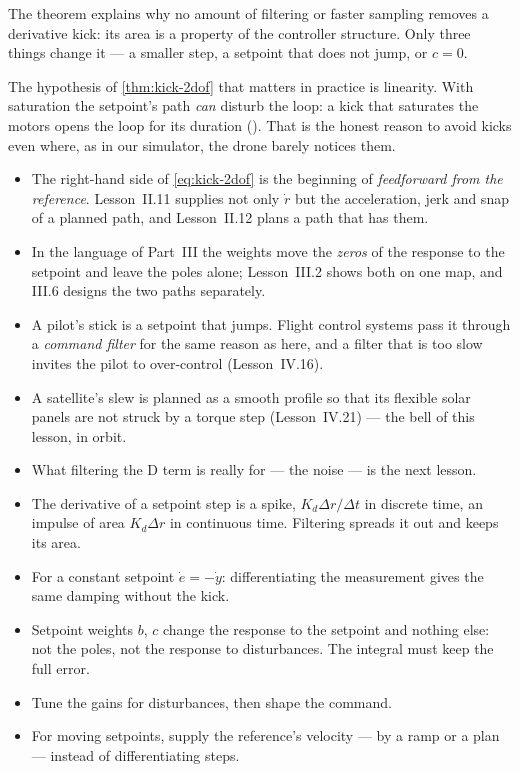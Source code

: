 The theorem explains why no amount of filtering or faster sampling removes a derivative kick: its area is a property of the controller structure. Only three things change it — a smaller step, a setpoint that does not jump, or $c = 0$.

The hypothesis of \cref{thm:kick-2dof} that matters in practice is linearity. With saturation the setpoint's path \emph{can} disturb the loop: a kick that saturates the motors opens the loop for its duration (). That is the honest reason to avoid kicks even where, as in our simulator, the drone barely notices them.

\begin{lookahead}
\begin{itemize}[leftmargin=1.2em]
  \item The right-hand side of \cref{eq:kick-2dof} is the beginning of \emph{feedforward from the reference}. Lesson~II.11 supplies not only $\dot r$ but the acceleration, jerk and snap of a planned path, and Lesson~II.12 plans a path that has them.
  \item In the language of Part~III the weights move the \emph{zeros} of the response to the setpoint and leave the poles alone; Lesson~III.2 shows both on one map, and III.6 designs the two paths separately.
  \item A pilot's stick is a setpoint that jumps. Flight control systems pass it through a \emph{command filter} for the same reason as here, and a filter that is too slow invites the pilot to over-control (Lesson~IV.16).
  \item A satellite's slew is planned as a smooth profile so that its flexible solar panels are not struck by a torque step (Lesson~IV.21) — the bell of this lesson, in orbit.
  \item What filtering the D term is really for — the noise — is the next lesson.
\end{itemize}
\end{lookahead}

\begin{remember}
\begin{itemize}
  \item The derivative of a setpoint step is a spike, $K_d\Delta r/\Delta t$ in discrete time, an impulse of area $K_d\Delta r$ in continuous time. Filtering spreads it out and keeps its area.
  \item For a constant setpoint $\dot e = -\dot y$: differentiating the measurement gives the same damping without the kick.
  \item Setpoint weights $b$, $c$ change the response to the setpoint and nothing else: not the poles, not the response to disturbances. The integral must keep the full error.
  \item Tune the gains for disturbances, then shape the command.
  \item For moving setpoints, supply the reference's velocity — by a ramp or a plan — instead of differentiating steps.
\end{itemize}
\end{remember}

